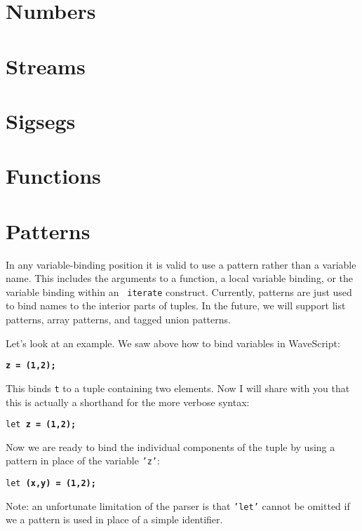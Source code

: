 \section{Numbers}



\section{Streams}

\section{Sigsegs}

\section{Functions}

\section{Patterns}

In any variable-binding position it is valid to use a pattern rather
than a variable name.  This includes the arguments to a function, a
local variable binding, or the variable binding within an {\tt
  iterate} construct.  Currently, patterns are just used to bind names
to the interior parts of tuples.  In the future, we will support list
patterns, array patterns, and tagged union patterns.  

Let's look at an example.
We saw above how to bind variables in WaveScript:
\begin{center}
{\tt \bf{z} = (1,2);}
\end{center}
This binds {\tt t} to a tuple containing two elements.  
Now I will share with you that this is actually a shorthand for the
more verbose syntax:
\begin{center}
{\tt let \bf{z} = (1,2);}
\end{center}
Now we are ready to bind the individual components of the tuple by using
a pattern in place of the variable {\tt 'z'}:
\begin{center}
{\tt let \bf{(x,y)} = (1,2);}
\end{center}
Note: an unfortunate limitation of the parser is that {\tt 'let'} cannot be
omitted if we a pattern is used in place of a simple identifier.

